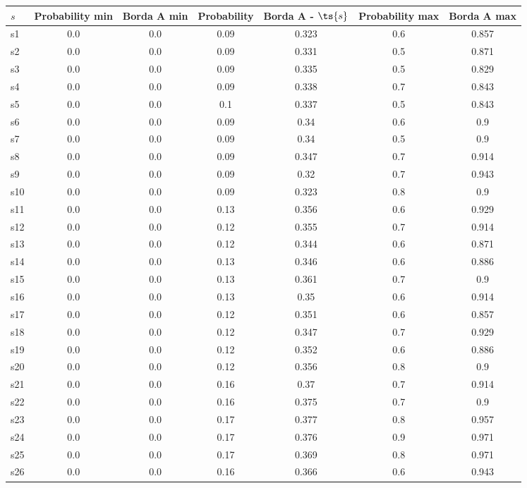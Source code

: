 \documentclass{article}
\begin{document}
\noindent\begin{tabular}{|l|c|c|c|c|c|c|}
\hline
$s$& Probability min & Borda A min & Probability & Borda A - $\ts{s}$ & Probability max & Borda A max\\
\hline
s1 &0.0 & 0.0 & 0.09 & 0.323 & 0.6 & 0.857\\
\hline
s2 &0.0 & 0.0 & 0.09 & 0.331 & 0.5 & 0.871\\
\hline
s3 &0.0 & 0.0 & 0.09 & 0.335 & 0.5 & 0.829\\
\hline
s4 &0.0 & 0.0 & 0.09 & 0.338 & 0.7 & 0.843\\
\hline
s5 &0.0 & 0.0 & 0.1 & 0.337 & 0.5 & 0.843\\
\hline
s6 &0.0 & 0.0 & 0.09 & 0.34 & 0.6 & 0.9\\
\hline
s7 &0.0 & 0.0 & 0.09 & 0.34 & 0.5 & 0.9\\
\hline
s8 &0.0 & 0.0 & 0.09 & 0.347 & 0.7 & 0.914\\
\hline
s9 &0.0 & 0.0 & 0.09 & 0.32 & 0.7 & 0.943\\
\hline
s10 &0.0 & 0.0 & 0.09 & 0.323 & 0.8 & 0.9\\
\hline
s11 &0.0 & 0.0 & 0.13 & 0.356 & 0.6 & 0.929\\
\hline
s12 &0.0 & 0.0 & 0.12 & 0.355 & 0.7 & 0.914\\
\hline
s13 &0.0 & 0.0 & 0.12 & 0.344 & 0.6 & 0.871\\
\hline
s14 &0.0 & 0.0 & 0.13 & 0.346 & 0.6 & 0.886\\
\hline
s15 &0.0 & 0.0 & 0.13 & 0.361 & 0.7 & 0.9\\
\hline
s16 &0.0 & 0.0 & 0.13 & 0.35 & 0.6 & 0.914\\
\hline
s17 &0.0 & 0.0 & 0.12 & 0.351 & 0.6 & 0.857\\
\hline
s18 &0.0 & 0.0 & 0.12 & 0.347 & 0.7 & 0.929\\
\hline
s19 &0.0 & 0.0 & 0.12 & 0.352 & 0.6 & 0.886\\
\hline
s20 &0.0 & 0.0 & 0.12 & 0.356 & 0.8 & 0.9\\
\hline
s21 &0.0 & 0.0 & 0.16 & 0.37 & 0.7 & 0.914\\
\hline
s22 &0.0 & 0.0 & 0.16 & 0.375 & 0.7 & 0.9\\
\hline
s23 &0.0 & 0.0 & 0.17 & 0.377 & 0.8 & 0.957\\
\hline
s24 &0.0 & 0.0 & 0.17 & 0.376 & 0.9 & 0.971\\
\hline
s25 &0.0 & 0.0 & 0.17 & 0.369 & 0.8 & 0.971\\
\hline
s26 &0.0 & 0.0 & 0.16 & 0.366 & 0.6 & 0.943\\

\end{tabular}
\end{document}
